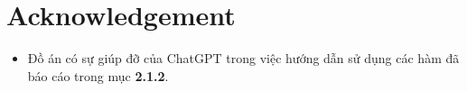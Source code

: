 \newpage
\section*{Acknowledgement}
\begin{itemize}
    \item Đồ án có sự giúp đỡ của ChatGPT trong việc hướng dẫn sử dụng các hàm đã báo cáo trong mục \textbf{2.1.2}.
\end{itemize}